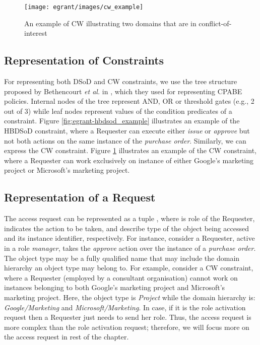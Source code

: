 \documentclass[epsfig,a4paper,11pt,titlepage]{book}
\numberwithin{algorithm}{chapter}
\begin{document}
\begin{figure} [htp]
\centering
\texttt{[image: egrant/images/cw\_example]}
\caption[An example of Chinese Wall]{An example of \gls{CW} illustrating two domains that are in conflict-of-interest}
\label{fig:egrant-cw_example}
\end{figure}

\subsection{Representation of Constraints}
For representing both \gls{DSoD} and \gls{CW} constraints, we use the tree structure proposed by Bethencourt \emph{et al.} in \cite{Bethencourt:2007}, which they used for representing \gls{CPABE} policies. Internal nodes of the tree represent AND, OR or threshold gates (e.g., 2 out of 3) while leaf nodes represent values of the condition predicates of a constraint. Figure \ref{fig:egrant-hbdsod_example} illustrates an example of the \gls{HBDSoD} constraint, where a Requester can execute either \emph{issue} or \emph{approve} but not both actions on the same instance of the \emph{purchase order}. Similarly, we can express the \gls{CW} constraint. Figure \ref{fig:egrant-cw_example} illustrates an example of the \gls{CW} constraint, where a Requester can work exclusively on instance of either Google's marketing project or Microsoft's marketing project.

\subsection{Representation of a Request}
The access request can be represented as a tuple , where  is role of the Requester,  indicates the action to be taken,  and  describe type of the object being accessed and its instance identifier, respectively. For instance, consider a Requester, active in a role \emph{manager}, takes the \emph{approve} action over the instance of a \emph{purchase order}. The object type  may be a fully qualified name that may include the domain hierarchy an object type may belong to. For example, consider a \gls{CW} constraint, where a Requester (employed by a consultant organisation) cannot work on instances belonging to both Google's marketing project and Microsoft's marketing project. Here, the object type  is \emph{Project} while the domain hierarchy is: \emph{Google/Marketing} and \emph{Microsoft/Marketing}. In case, if it is the role activation request then a Requester just needs to send her role. Thus, the access request is more complex than the role activation request; therefore, we will focus more on the access request in rest of the chapter.
\end{document}
